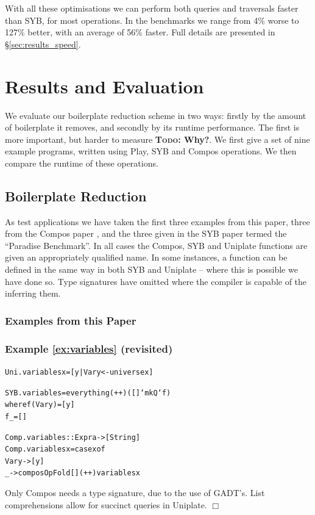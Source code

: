 \documentclass[preprint]{sigplanconf}
\newcommand{\noexample}{\hfill$\Box$}
\newcommand{\todo}[1]{\textbf{\textsc{Todo:} #1}}
\newenvironment{code}{\begin{alltt}\small}{\end{alltt}}
\newenvironment{revisit}[1]{\subsubsection*{Example #1 (revisited)}}{\noexample}
\begin{document}
With all these optimisations we can perform both queries and traversals faster than SYB, for most operations. In the benchmarks we range from 4\% worse to 127\% better, with an average of 56\% faster. Full details are presented in \S\ref{sec:results_speed}.


\section{Results and Evaluation}
\label{sec:results}

We evaluate our boilerplate reduction scheme in two ways: firstly by the amount of boilerplate it removes, and secondly by its runtime performance. The first is more important, but harder to measure \todo{Why?}. We first give a set of nine example programs, written using Play, SYB and Compos operations. We then compare the runtime of these operations.

\subsection{Boilerplate Reduction}
\label{sec:results_boilerplate}

As test applications we have taken the first three examples from this paper, three from the Compos paper \citep{bringert:compos}, and the three given in the SYB paper \citep{lammel:syb} termed the ``Paradise Benchmark''. In all cases the Compos, SYB and Uniplate functions are given an appropriately qualified name. In some instances, a function can be defined in the same way in both SYB and Uniplate -- where this is possible we have done so. Type signatures have omitted where the compiler is capable of the inferring them.

\subsubsection{Examples from this Paper}

\begin{revisit}{\ref{ex:variables}}

\begin{code}
Uni.variables x = [y | Var y <- universe x]

SYB.variables = everything (++) ([] `mkQ` f)
    where  f (Var y)  = [y]
           f _        = []

Comp.variables :: Expr a -> [String]
Comp.variables x = case x of
    Var y -> [y]
    _ -> composOpFold [] (++) variables x
\end{code}

Only Compos needs a type signature, due to the use of GADT's. List comprehensions allow for succinct queries in Uniplate.
\end{revisit}
\end{document}
